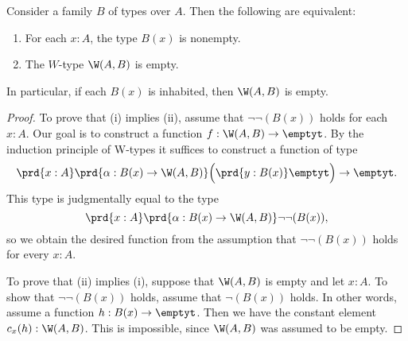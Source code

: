 \begin{prp}\label{prp:is-empty-W}
  Consider a family $B$ of types over $A$. Then the following are equivalent:
  \begin{enumerate}
  \item For each $x:A$, the type $B(x)$ is nonempty.
  \item The $W$-type $\W(A,B)$ is empty.
  \end{enumerate}
  In particular, if each $B(x)$ is inhabited, then $\W(A,B)$ is empty.
\end{prp}

\begin{proof}
  To prove that (i) implies (ii), assume that $\neg\neg(B(x))$ holds for each $x:A$. Our goal is to construct a function $f:\W(A,B)\to \emptyt$. By the induction principle of W-types it suffices to construct a function of type
  \begin{equation*}
    \prd{x:A}\prd{\alpha:B(x)\to\W(A,B)}\Big(\prd{y:B(x)}\emptyt\Big)\to\emptyt.
  \end{equation*}
  This type is judgmentally equal to the type
  \begin{equation*}
    \prd{x:A}\prd{\alpha:B(x)\to\W(A,B)}\neg\neg(B(x)),
  \end{equation*}
  so we obtain the desired function from the assumption that $\neg\neg(B(x))$ holds for every $x:A$.

  To prove that (ii) implies (i), suppose that $\W(A,B)$ is empty and let $x:A$. To show that $\neg\neg(B(x))$ holds, assume that $\neg(B(x))$ holds. In other words, assume a function $h:B(x)\to\emptyt$. Then we have the constant element $c_x(h):\W(A,B)$. This is impossible, since $\W(A,B)$ was assumed to be empty.
\end{proof}

